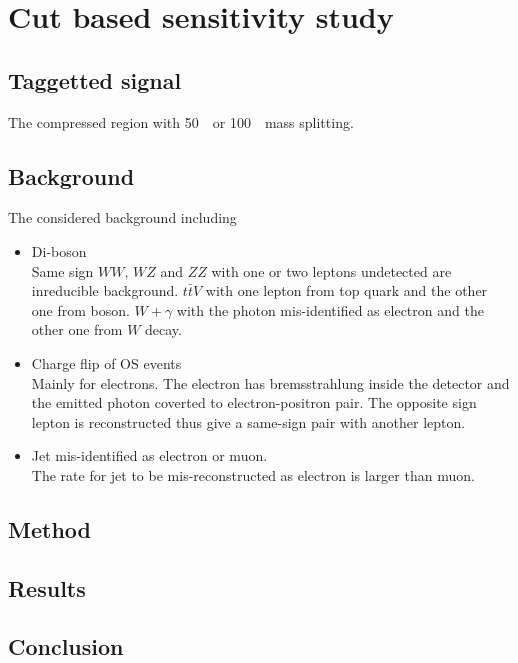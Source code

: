 \clearpage
\section{Cut based sensitivity study}
\subsection{Taggetted signal}
The compressed region with 50~\GeV\ or 100~\GeV\ mass splitting.

\subsection{Background}
The considered background including
\begin{itemize}
  \item Di-boson\\
    Same sign $WW$, $WZ$ and $ZZ$ with one or two leptons undetected are inreducible background. $t\bar{t}V$ with one lepton from top quark and the other one from boson. $W+\gamma$ with the photon mis-identified as electron and the other one from $W$ decay.
  \item Charge flip of OS events\\
    Mainly for electrons. The electron has bremsstrahlung inside the detector and the emitted photon coverted to electron-positron pair. The opposite sign lepton is reconstructed thus give a same-sign pair with another lepton.
  \item Jet mis-identified as electron or muon.\\
    The rate for jet to be mis-reconstructed as electron is larger than muon.
\end{itemize}

\subsection{Method}

\subsection{Results}

\subsection{Conclusion}

